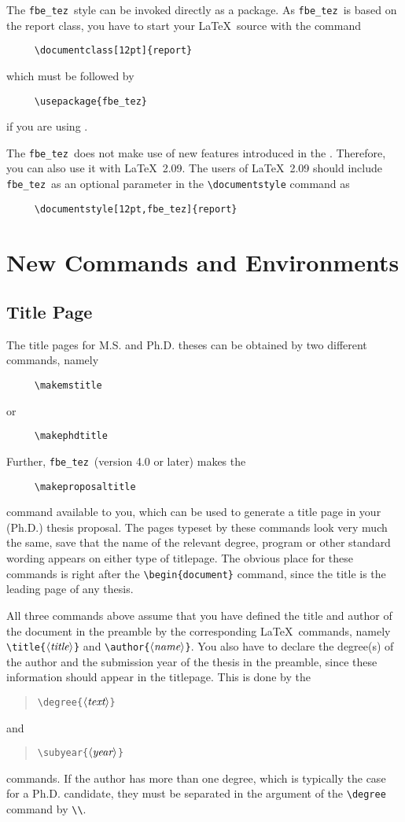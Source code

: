 \documentclass[12pt]{article}
\newcommand\fbe{{\tt fbe\_tez}}
\newcommand{\bq}{\begin{quotation}\noindent}
\newcommand{\eq}{\end{quotation}}
\renewcommand{\arg}[1]{$\langle\mbox{\it #1}\rangle$}
\begin{document}
The \fbe\ style can be invoked directly as a package. As \fbe\ is
based on the report class, you have to start your \LaTeX\ source with
the command
\begin{verbatim}
     \documentclass[12pt]{report}
\end{verbatim}
which must be followed by
\begin{verbatim}
     \usepackage{fbe_tez}
\end{verbatim}
if you are using \LaTeXe.

The \fbe\ does not make use of new features introduced in the
\LaTeXe. Therefore, you can also use it with \LaTeX~2.09. The users
of \LaTeX~2.09 should include \fbe\ as an optional parameter in the
\verb/\documentstyle/ command as
\begin{verbatim}
     \documentstyle[12pt,fbe_tez]{report}
\end{verbatim}

\section{New Commands and Environments}
\subsection{Title Page}
The title pages for M.S. and Ph.D. theses can be obtained by two
different commands, namely
\begin{verbatim}
     \makemstitle
\end{verbatim}
or
\begin{verbatim}
     \makephdtitle
\end{verbatim}
Further, \fbe\ (version 4.0 or later) makes the
\begin{verbatim}
     \makeproposaltitle
\end{verbatim}
command available to you, which can be used to generate a title page
in your (Ph.D.) thesis proposal. The pages typeset by these commands
look very much the same, save that the name of the relevant degree,
program or other standard wording appears on either type of titlepage.
The obvious place for these commands is right after the
\verb/\begin{document}/ command, since the title is the leading
page of any thesis.

All three commands above assume that you have defined the title and
author of the document in the preamble by the corresponding \LaTeX\
commands, namely \verb/\title{/\arg{title}\verb/}/ and
\verb/\author{/\arg{name}\verb/}/.
You also have to declare the degree(s) of the author and the
submission year of the thesis in the preamble, since these information
should appear in the titlepage. This is done by the
\bq
\verb/\degree{/\arg{text}\verb/}/
\eq
and
\bq
\verb/\subyear{/\arg{year}\verb/}/
\eq
commands. If the author has more than one degree, which is typically
the case for a Ph.D. candidate, they must be separated in the argument
of the \verb/\degree/ command by \verb/\\/.
\end{document}
